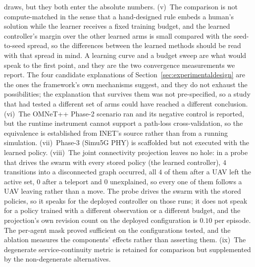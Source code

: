 \documentclass[conference]{IEEEtran}
\newcommand{\tokConnAllLeaving}{every one of them follows a UAV leaving rather than a move}
\newcommand{\tokConnAsc}{4}
\newcommand{\tokConnPolicy}{every stored policy (the learned controller)}
\newcommand{\tokConnSteps}{4}
\newcommand{\tokConnTele}{0}
\newcommand{\tokConnUnexplained}{0}
\newcommand{\tokProjRevisions}{0.10}
\begin{document}
draws, but they both enter the absolute numbers. (v)~The comparison is not compute-matched in the sense that a hand-designed rule embeds a human's solution while the learner receives a fixed training budget, and the learned controller's margin over the other learned arms is small compared with the seed-to-seed spread, so the differences between the learned methods should be read with that spread in mind. A learning curve and a budget sweep are what would speak to the first point, and they are the two convergence measurements we report. The four candidate explanations of Section~\ref{sec:experimentaldesign} are the ones the framework's own mechanisms suggest, and they do not exhaust the possibilities; the explanation that survives them was not pre-specified, so a study that had tested a different set of arms could have reached a different conclusion. (vi)~The OMNeT++ Phase-2 scenario ran and its negative control is reported, but the runtime instrument cannot support a path-loss cross-validation, so the equivalence is established from INET's source rather than from a running simulation. (vii)~Phase-3 (Simu5G PHY) is scaffolded but not executed with the learned policy. (viii)~The joint connectivity projection leaves no hole: in a probe that drives the swarm with \tokConnPolicy{}, $\tokConnSteps$ transitions into a disconnected graph occurred, all $\tokConnAsc$ of them after a UAV left the active set, $\tokConnTele$ after a teleport and $\tokConnUnexplained$ unexplained, so \tokConnAllLeaving.  The probe drives the swarm with the stored policies, so it speaks for the deployed controller on those runs; it does not speak for a policy trained with a different observation or a different budget, and the projection's own revision count on the deployed configuration is $\tokProjRevisions$ per episode. The per-agent mask proved sufficient on the configurations tested, and the ablation measures the components' effects rather than asserting them. (ix)~The degenerate service-continuity metric is retained for comparison but supplemented by the non-degenerate alternatives.
\end{document}
